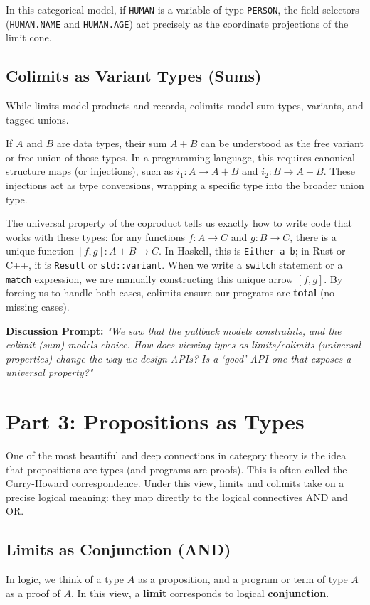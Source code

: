 \documentclass{article}
\begin{document}
In this categorical model, if \texttt{HUMAN} is a variable of type \texttt{PERSON}, the field selectors (\texttt{HUMAN.NAME} and \texttt{HUMAN.AGE}) act precisely as the coordinate projections of the limit cone. 

\subsection{Colimits as Variant Types (Sums)}
While limits model products and records, colimits model sum types, variants, and tagged unions. 

If \(A\) and \(B\) are data types, their sum \(A + B\) can be understood as the free variant or free union of those types. In a programming language, this requires canonical structure maps (or injections), such as \(i_1: A \to A + B\) and \(i_2: B \to A + B\). These injections act as type conversions, wrapping a specific type into the broader union type. 

The universal property of the coproduct tells us exactly how to write code that works with these types: for any functions \(f: A \to C\) and \(g: B \to C\), there is a unique function \([f, g]: A + B \to C\). In Haskell, this is \texttt{Either a b}; in Rust or C++, it is \texttt{Result} or \texttt{std::variant}. When we write a \texttt{switch} statement or a \texttt{match} expression, we are manually constructing this unique arrow \([f, g]\). By forcing us to handle both cases, colimits ensure our programs are \textbf{total} (no missing cases).

\textbf{Discussion Prompt:} \textit{"We saw that the pullback models constraints, and the colimit (sum) models choice. How does viewing types as limits/colimits (universal properties) change the way we design APIs? Is a `good' API one that exposes a universal property?"}

\section{Part 3: Propositions as Types}
One of the most beautiful and deep connections in category theory is the idea that propositions are types (and programs are proofs). This is often called the Curry-Howard correspondence. Under this view, limits and colimits take on a precise logical meaning: they map directly to the logical connectives AND and OR.

\subsection{Limits as Conjunction (AND)}
In logic, we think of a type \(A\) as a proposition, and a program or term of type \(A\) as a proof of \(A\). In this view, a \textbf{limit} corresponds to logical \textbf{conjunction}. 
\end{document}
